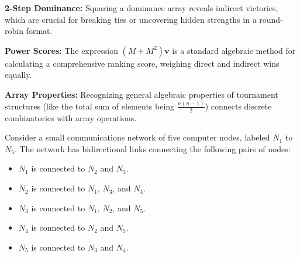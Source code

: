 \begin{takeaways}
\item \textbf{2-Step Dominance:} Squaring a dominance array reveals indirect victories, which are crucial for breaking ties or uncovering hidden strengths in a round-robin format.
\item \textbf{Power Scores:} The expression $(M + M^2)\mathbf{v}$ is a standard algebraic method for calculating a comprehensive ranking score, weighing direct and indirect wins equally.
\item \textbf{Array Properties:} Recognizing general algebraic properties of tournament structures (like the total sum of elements being $\frac{n(n-1)}{2}$) connects discrete combinatorics with array operations.
\end{takeaways}


\begin{problem}
Consider a small communications network of five computer nodes, labeled $N_1$ to $N_5$. The network has bidirectional links connecting the following pairs of nodes:
\begin{itemize}
    \item $N_1$ is connected to $N_2$ and $N_3$.
    \item $N_2$ is connected to $N_1$, $N_3$, and $N_4$.
    \item $N_3$ is connected to $N_1$, $N_2$, and $N_5$.
    \item $N_4$ is connected to $N_2$ and $N_5$.
    \item $N_5$ is connected to $N_3$ and $N_4$.
\end{itemize}

\begin{center}
\end{center}


\end{problem}
